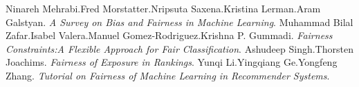 \documentclass{article}
\begin{document}
\begin{thebibliography}{9}
Ninareh Mehrabi.Fred Morstatter.Nripsuta Saxena.Kristina Lerman.Aram Galstyan.
\textit{A Survey on Bias and Fairness in Machine Learning}.
Muhammad Bilal Zafar.Isabel Valera.Manuel Gomez-Rodriguez.Krishna P. Gummadi.
\textit{Fairness Constraints:A Flexible Approach for Fair Classification}.
Ashudeep Singh.Thorsten Joachims.
\textit{Fairness of Exposure in Rankings}.
Yunqi Li.Yingqiang Ge.Yongfeng Zhang.
\textit{Tutorial on Fairness of Machine Learning in Recommender Systems}.

\end{thebibliography}
\end{document}
